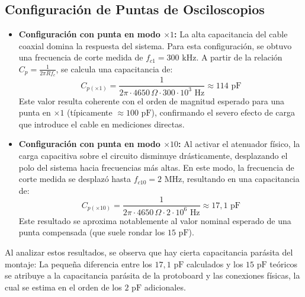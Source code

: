 \documentclass{article}
\begin{document}
\subsection*{Configuración de Puntas de Osciloscopios}
                    \begin{itemize}
    \item \textbf{Configuración con punta en modo $\times 1$:}
    La alta capacitancia del cable coaxial domina la respuesta del sistema. Para esta configuración, se obtuvo una frecuencia de corte medida de $f_{c1} = 300\text{ kHz}$. A partir de la relación $C_{p} = \frac{1}{2\pi R f_c}$, se calcula una capacitancia de:
    \begin{equation*}
    C_{p(\times 1)} = \frac{1}{2\pi \cdot 4650\,\Omega \cdot 300\cdot 10^3\text{ Hz}} \approx 114\text{ pF}
    \end{equation*}
    Este valor resulta coherente con el orden de magnitud esperado para una punta en $\times 1$ (típicamente $\approx 100\text{ pF}$), confirmando el severo efecto de carga que introduce el cable en mediciones directas.
    
    \item \textbf{Configuración con punta en modo $\times 10$:}
    Al activar el atenuador físico, la carga capacitiva sobre el circuito disminuye drásticamente, desplazando el polo del sistema hacia frecuencias más altas. En este modo, la frecuencia de corte medida se desplazó hasta $f_{c10} = 2\text{ MHz}$, resultando en una capacitancia de:
    \begin{equation*}
    C_{p(\times 10)} = \frac{1}{2\pi \cdot 4650\,\Omega \cdot 2\cdot 10^6\text{ Hz}} \approx 17,1\text{ pF}
    \end{equation*}
    Este resultado se aproxima notablemente al valor nominal esperado de una punta compensada (que suele rondar los $15\text{ pF}$).
                    \end{itemize}
                    Al analizar estos resultados, se observa que hay cierta capacitancia parásita del montaje: 
                    La pequeña diferencia entre los $17,1\text{ pF}$ calculados y los $15\text{ pF}$ teóricos se atribuye a la capacitancia parásita de la protoboard y las conexiones físicas, la cual se estima en el orden de los $2\text{ pF}$ adicionales.



        
\end{document}
